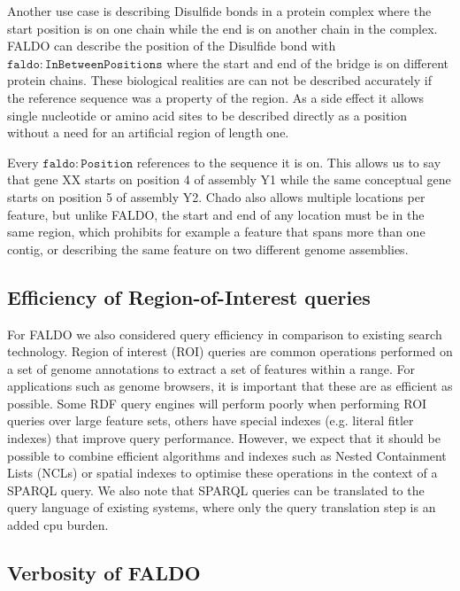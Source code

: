 Another use case is describing Disulfide bonds in a protein complex where the start position is on one chain while the end is on another chain in the complex. FALDO can describe the position of the Disulfide bond with $\mathtt{faldo\colon{}InBetweenPositions}$ where the start and end of the bridge is on different protein chains.
These biological realities are can not be described accurately if the reference sequence was a property of the region. 
As a side effect it allows single nucleotide or amino acid sites to be described directly as a position without a need for an artificial region of length one.

Every $\mathtt{faldo\colon{}Position}$ references to the sequence it is on. This allows us to say that gene XX starts on position 4 of assembly Y1 while the same conceptual gene starts on position 5 of assembly Y2. Chado also allows multiple locations per feature, but unlike FALDO, the start and end of
any location must be in the same region, which prohibits for example a feature that spans more than one contig, or describing the same feature on two different genome assemblies.

\subsection*{Efficiency of Region-of-Interest queries}

For FALDO we also considered query efficiency in comparison to existing search technology. 
Region of interest (ROI) queries are common operations performed on a
set of genome annotations to extract a set of features within a
range. For applications such as genome browsers, it is important that
these are as efficient as possible. Some RDF query engines will
perform poorly when performing ROI queries over large feature
sets, others have special indexes (e.g. literal fitler indexes) 
that improve query performance. However, we expect that it should be possible to combine
efficient algorithms and indexes such as Nested Containment Lists
(NCLs)\cite{NCL2007} or spatial indexes to optimise these operations
in the context of a SPARQL query. We also note that SPARQL queries can
be translated to the query language of existing systems, where only 
the query translation step is an added cpu burden.

\subsection*{Verbosity of FALDO}

